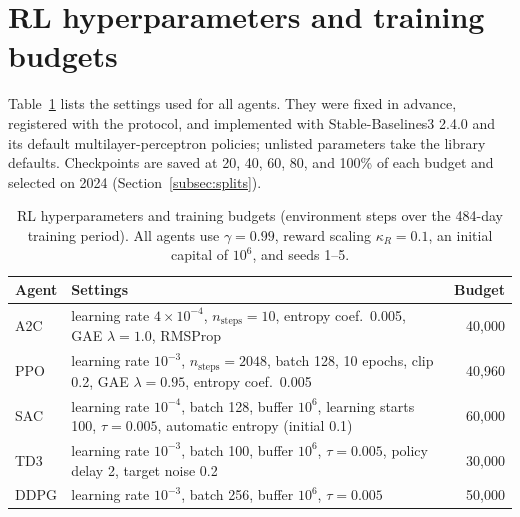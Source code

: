 \documentclass[pdflatex,sn-mathphys-num]{sn-jnl}%
\theoremstyle{thmstyleone}%
\theoremstyle{thmstyletwo}%
\theoremstyle{thmstylethree}%
\begin{document}
{\color{blue}
\section{RL hyperparameters and training budgets}\label{app:hyper}
Table~\ref{tab:hyper} lists the settings used for all agents. They were fixed in advance, registered with the protocol, and implemented with Stable-Baselines3 2.4.0 and its default multilayer-perceptron policies; unlisted parameters take the library defaults. Checkpoints are saved at 20, 40, 60, 80, and 100\% of each budget and selected on 2024 (Section~\ref{subsec:splits}).

\begin{table}[!h]
\centering\small
\caption{RL hyperparameters and training budgets (environment steps over the 484-day training period). All agents use $\gamma=0.99$, reward scaling $\kappa_R=0.1$, an initial capital of $10^6$, and seeds 1--5.}
\label{tab:hyper}
\begin{tabular}{lp{8.2cm}r}
\toprule
Agent & Settings & Budget \\
\midrule
A2C & learning rate $4\times10^{-4}$, $n_{\mathrm{steps}}=10$, entropy coef.\ 0.005, GAE $\lambda=1.0$, RMSProp & 40{,}000 \\
PPO & learning rate $10^{-3}$, $n_{\mathrm{steps}}=2048$, batch 128, 10 epochs, clip 0.2, GAE $\lambda=0.95$, entropy coef.\ 0.005 & 40{,}960 \\
SAC & learning rate $10^{-4}$, batch 128, buffer $10^6$, learning starts 100, $\tau=0.005$, automatic entropy (initial 0.1) & 60{,}000 \\
TD3 & learning rate $10^{-3}$, batch 100, buffer $10^6$, $\tau=0.005$, policy delay 2, target noise 0.2 & 30{,}000 \\
DDPG & learning rate $10^{-3}$, batch 256, buffer $10^6$, $\tau=0.005$ & 50{,}000 \\
\bottomrule
\end{tabular}
\end{table}
\par}
\end{document}

